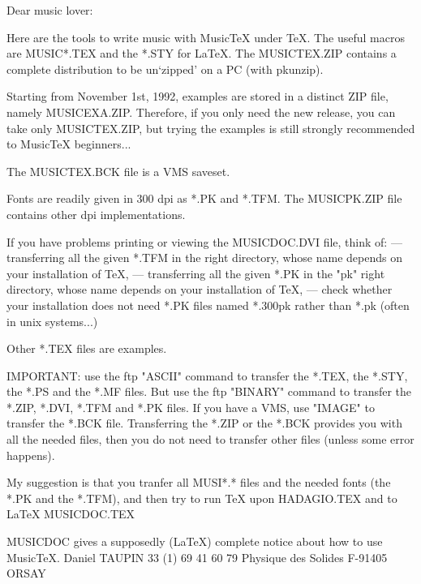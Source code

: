 Dear music lover:

Here are the tools to write music with MusicTeX under TeX.
The useful macros are MUSIC*.TEX and the *.STY for LaTeX.
The MUSICTEX.ZIP contains a complete distribution to be un`zipped'
on a PC (with pkunzip). 

Starting from November 1st, 1992, examples are stored in a distinct ZIP file,
namely MUSICEXA.ZIP. Therefore, if you only need the new release, you can take
only MUSICTEX.ZIP, but trying the examples is still strongly recommended to
MusicTeX beginners...

The MUSICTEX.BCK file is a VMS saveset.

Fonts are readily given in 300 dpi as *.PK and *.TFM. The MUSICPK.ZIP
file contains other dpi implementations.

If you have problems printing or viewing the MUSICDOC.DVI file, think of:
 --- transferring all the given *.TFM in the right directory, whose name
     depends on your installation of TeX,
 --- transferring all the given *.PK in the "pk" right directory, whose name
     depends on your installation of TeX,
 --- check whether your installation does not need *.PK files named *.300pk
     rather than *.pk (often in unix systems...)

Other *.TEX files are examples. 

IMPORTANT: use the ftp "ASCII" command to transfer the *.TEX,
the *.STY, the *.PS and the *.MF files. But use the ftp "BINARY" command
to transfer the *.ZIP, *.DVI, *.TFM and *.PK files. If you have a VMS,
use "IMAGE" to transfer the *.BCK file. Transferring the *.ZIP
or the *.BCK provides you with all the needed files, then you
do not need to transfer other files (unless some error happens).

My suggestion is that you tranfer all MUSI*.* files and
the needed fonts (the *.PK and the *.TFM), and
then try to run TeX upon HADAGIO.TEX and to LaTeX MUSICDOC.TEX

MUSICDOC gives a supposedly (LaTeX) complete notice about how to use MusicTeX.
                             Daniel TAUPIN
                             33 (1) 69 41 60 79
                             Physique des Solides
                             F-91405 ORSAY
